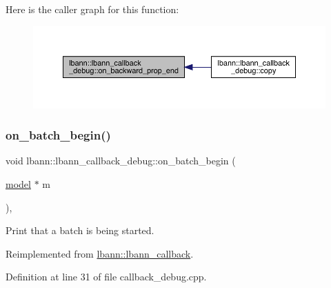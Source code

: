 Here is the caller graph for this function\+:\nopagebreak
\begin{figure}[H]
\begin{center}
\leavevmode
\includegraphics[width=350pt]{classlbann_1_1lbann__callback__debug_a19a8ec63f55fc86024c9ab8fe0836500_icgraph}
\end{center}
\end{figure}
\mbox{\label{classlbann_1_1lbann__callback__debug_abab8f3b9c1db3d0ef3a715afc7b880db}} 
\subsubsection{\texorpdfstring{on\+\_\+batch\+\_\+begin()}{on\_batch\_begin()}}
{\footnotesize\ttfamily void lbann\+::lbann\+\_\+callback\+\_\+debug\+::on\+\_\+batch\+\_\+begin (\begin{DoxyParamCaption}\item[{\hyperlink{classlbann_1_1model}{model} $\ast$}]{m }\end{DoxyParamCaption})\hspace{0.3cm}{\ttfamily [override]}, {\ttfamily [virtual]}}

Print that a batch is being started. 

Reimplemented from \hyperlink{classlbann_1_1lbann__callback_a9ecf4e44cd4021cdd687de14c850cc83}{lbann\+::lbann\+\_\+callback}.



Definition at line 31 of file callback\+\_\+debug.\+cpp.


